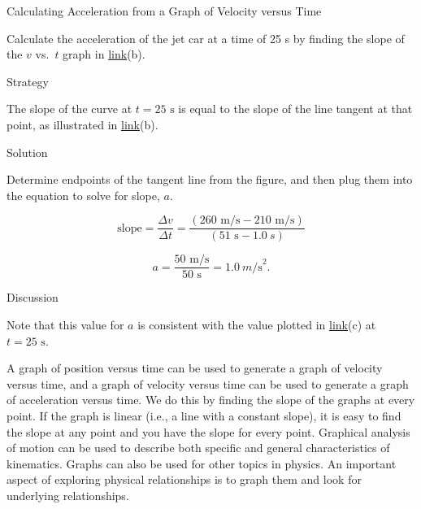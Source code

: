 \documentclass[
]{book}
\newenvironment{tinysection}{}{}
\begin{document}
\hypertarget{fs-id1406638}{}
Calculating Acceleration from a Graph of Velocity versus Time

Calculate the acceleration of the jet car at a time of 25 s by finding
the slope of the \(v{}\) vs.~\(t{}\) graph in
\protect\hyperlink{import-auto-id1534076}{link}(b).

\begin{tinysection}

{Strategy}

\end{tinysection}

The slope of the curve at \({t = \text{25\ s}}{}\) is equal to the slope
of the line tangent at that point, as illustrated in
\protect\hyperlink{import-auto-id1534076}{link}(b).

\begin{tinysection}

{Solution}

\end{tinysection}

Determine endpoints of the tangent line from the figure, and then plug
them into the equation to solve for slope, \(a{}\).

\leavevmode\hypertarget{import-auto-id3503054}{}%
\[\text{slope} = \frac{\Delta v}{\Delta t} = \frac{\left( {\text{260\ m/s} - \text{210\ m/s}} \right)}{\left( {\text{51\ s} - 1.0\ s} \right)}\]

\leavevmode\hypertarget{import-auto-id2028886}{}%
\[{{{a = \frac{\text{50\ m/s}}{\text{50\ s}}} = 1}\text{.}0\ m\text{/s}^{2}}.\]

\begin{tinysection}

{Discussion}

\end{tinysection}

Note that this value for \(a{}\) is consistent with the value plotted in
\protect\hyperlink{import-auto-id1534076}{link}(c) at
\({t = \text{25\ s}}{}\).

A graph of position versus time can be used to generate a graph of
velocity versus time, and a graph of velocity versus time can be used to
generate a graph of acceleration versus time. We do this by finding the
slope of the graphs at every point. If the graph is linear (i.e., a line
with a constant slope), it is easy to find the slope at any point and
you have the slope for every point. Graphical analysis of motion can be
used to describe both specific and general characteristics of
kinematics. Graphs can also be used for other topics in physics. An
important aspect of exploring physical relationships is to graph them
and look for underlying relationships.
\end{document}
